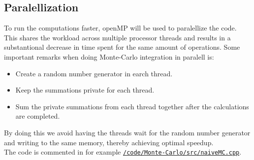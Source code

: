 \documentclass[../main.tex]{subfiles}
\begin{document}
\subsection{Paralellization} \label{sec:theory-Paralellization}

To run the computations faster, openMP will be used to paralellize the code. This shares the workload across multiple processor threads and results in a substantional decrease in time spent for the same amount of operations. Some important remarks when doing Monte-Carlo integration in paralell is:
\begin{itemize}
 \item Create a random number generator in earch thread.
 \item Keep the summations private for each thread.
 \item Sum the private summations from each thread together after the calculations are completed.
\end{itemize}
By doing this we avoid having the threads wait for the random number generator and writing to the same memory, thereby achieving optimal speedup.
\\
The code is commented in for example \href{https://github.com/kmaasrud/Project-3/blob/master/code/Monte-Carlo/src/naiveMC.cpp}{\texttt{/code/Monte-Carlo/src/naiveMC.cpp}}.
\end{document}

